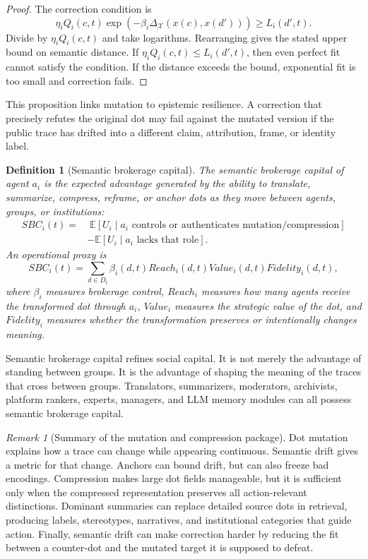 \documentclass[11pt]{article}
\newtheorem{definition}{Definition}
\theoremstyle{remark}
\newtheorem{remark}{Remark}
\begin{document}
\begin{proof}
The correction condition is
$$
\eta_i Q_i(c,t)\exp(-\beta_i\Delta_{\mathcal X}(x(c),x(d')))\geq L_i(d',t).
$$
Divide by $\eta_i Q_i(c,t)$ and take logarithms. Rearranging gives the
stated upper bound on semantic distance. If $\eta_i Q_i(c,t)\leq L_i(d',t)$,
then even perfect fit cannot satisfy the condition. If the distance
exceeds the bound, exponential fit is too small and correction fails.
\end{proof}

This proposition links mutation to epistemic resilience. A correction
that precisely refutes the original dot may fail against the mutated
version if the public trace has drifted into a different claim,
attribution, frame, or identity label.

\begin{definition}[Semantic brokerage capital]\label{def:semantic-brokerage-capital}
The semantic brokerage capital of agent $a_i$ is the expected advantage
generated by the ability to translate, summarize, compress, reframe, or
anchor dots as they move between agents, groups, or institutions:
\begin{align*}
SBC_i(t)=&\; \mathbb E[U_i\mid \text{$a_i$ controls or authenticates mutation/compression}]\\
&-\mathbb E[U_i\mid \text{$a_i$ lacks that role}].
\end{align*}
An operational proxy is
$$
SBC_i(t)=\sum_{d\in D_t}
\beta_i(d,t)Reach_i(d,t)Value_i(d,t)Fidelity_i(d,t),
$$
where $\beta_i$ measures brokerage control, $Reach_i$ measures how many
agents receive the transformed dot through $a_i$, $Value_i$ measures the
strategic value of the dot, and $Fidelity_i$ measures whether the
transformation preserves or intentionally changes meaning.
\end{definition}

Semantic brokerage capital refines social capital. It is not merely the
advantage of standing between groups. It is the advantage of shaping the
meaning of the traces that cross between groups. Translators,
summarizers, moderators, archivists, platform rankers, experts,
managers, and LLM memory modules can all possess semantic brokerage
capital.

\begin{remark}[Summary of the mutation and compression package]
Dot mutation explains how a trace can change while appearing continuous.
Semantic drift gives a metric for that change. Anchors can bound drift,
but can also freeze bad encodings. Compression makes large dot fields
manageable, but it is sufficient only when the compressed representation
preserves all action-relevant distinctions. Dominant summaries can
replace detailed source dots in retrieval, producing labels,
stereotypes, narratives, and institutional categories that guide action.
Finally, semantic drift can make correction harder by reducing the fit
between a counter-dot and the mutated target it is supposed to defeat.
\end{remark}
\end{document}
